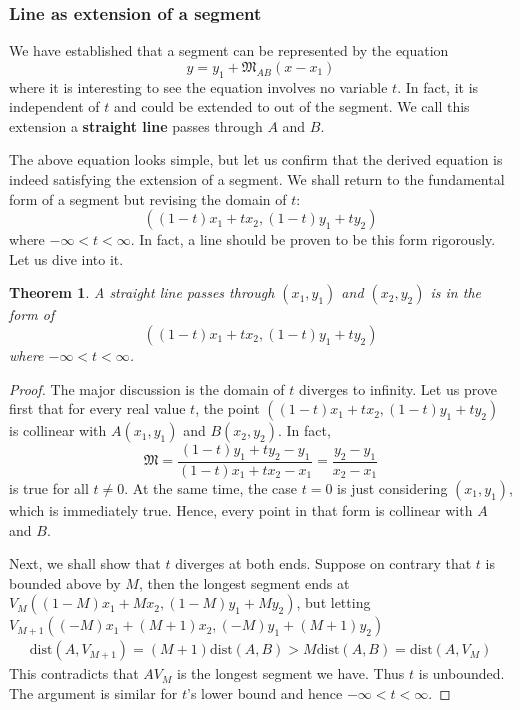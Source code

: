 \documentclass[12pt]{article}
\newtheorem*{theorem}{Theorem}
\begin{document}
    \subsubsection*{Line as extension of a segment}

    We have established that a segment can be represented by the equation $$y=y_1+\mathfrak{M}_{AB}(x-x_1)$$
    where it is interesting to see the equation involves no variable $t$. In fact, it is independent of $t$ and could be extended to out of the segment. We call this extension a \textbf{straight line} passes through $A$ and $B$.

    The above equation looks simple, but let us confirm that the derived equation is indeed satisfying the extension of a segment. We shall return to the fundamental form of a segment but revising the domain of $t$: $$((1-t)x_1+tx_2, (1-t)y_1+ty_2)$$ where $-\infty<t<\infty$. In fact, a line should be proven to be this form rigorously. Let us dive into it.

    \begin{theorem}
        A straight line passes through $(x_1,y_1)$ and $(x_2, y_2)$ is in the form of $$((1-t)x_1+tx_2, (1-t)y_1+ty_2)$$ where $-\infty<t<\infty$.
    \end{theorem}

    \begin{proof}
        The major discussion is the domain of $t$ diverges to infinity. Let us prove first that for every real value $t$, the point $((1-t)x_1+tx_2, (1-t)y_1+ty_2)$ is collinear with $A(x_1,y_1)$ and $B(x_2,y_2)$. In fact, $$\mathfrak{M}=\frac{(1-t)y_1+ty_2-y_1}{(1-t)x_1+tx_2-x_1}=\frac{y_2-y_1}{x_2-x_1}$$ is true for all $t\neq 0$. At the same time, the case $t=0$ is just considering $(x_1,y_1)$, which is immediately true. Hence, every point in that form is collinear with $A$ and $B$.

        Next, we shall show that $t$ diverges at both ends. Suppose on contrary that $t$ is bounded above by $M$, then the longest segment ends at $V_M((1-M)x_1+Mx_2, (1-M)y_1+My_2)$, but letting $V_{M+1}((-M)x_1+(M+1)x_2, (-M)y_1+(M+1)y_2)$\begin{align*}
            \mathrm{dist}(A,V_{M+1})=(M+1)\mathrm{dist}(A,B)>M\mathrm{dist}(A,B)=\mathrm{dist}(A,V_M)
        \end{align*}
        This contradicts that $AV_M$ is the longest segment we have. Thus $t$ is unbounded. The argument is similar for $t$'s lower bound and hence $-\infty<t<\infty$.
    \end{proof}
\end{document}
